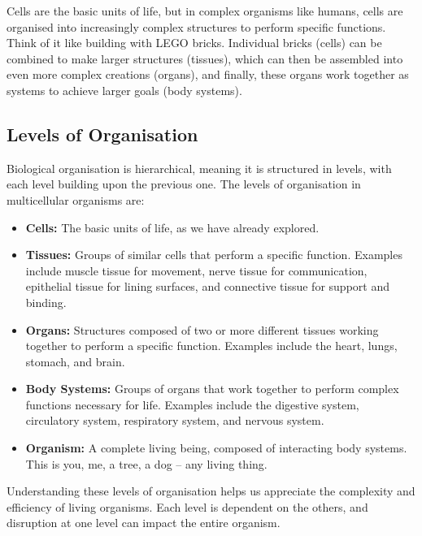Cells are the basic units of life, but in complex organisms like humans, cells are organised into increasingly complex structures to perform specific functions.  Think of it like building with LEGO bricks. Individual bricks (cells) can be combined to make larger structures (tissues), which can then be assembled into even more complex creations (organs), and finally, these organs work together as systems to achieve larger goals (body systems).

\subsection{Levels of Organisation}

Biological organisation is hierarchical, meaning it is structured in levels, with each level building upon the previous one.  The levels of organisation in multicellular organisms are:

\begin{itemize}
    \item \textbf{Cells:} The basic units of life, as we have already explored.
    \item \textbf{Tissues:} Groups of similar cells that perform a specific function. Examples include muscle tissue for movement, nerve tissue for communication, epithelial tissue for lining surfaces, and connective tissue for support and binding. 
    \item \textbf{Organs:} Structures composed of two or more different tissues working together to perform a specific function. Examples include the heart, lungs, stomach, and brain.  
    \item \textbf{Body Systems:} Groups of organs that work together to perform complex functions necessary for life. Examples include the digestive system, circulatory system, respiratory system, and nervous system.  
    \item \textbf{Organism:} A complete living being, composed of interacting body systems.  This is you, me, a tree, a dog – any living thing. 
\end{itemize}

Understanding these levels of organisation helps us appreciate the complexity and efficiency of living organisms.  Each level is dependent on the others, and disruption at one level can impact the entire organism.

